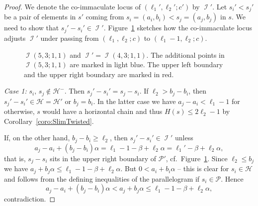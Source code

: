 \documentclass[11pt]{article}
\theoremstyle{definition}
\numberwithin{equation}{section}
\newcommand{\cP}{\mathcal{P}}
\newcommand{\cH}{\mathcal{H}}
\newcommand{\CH}{{\mathcal H}}
\newcommand{\CI}{{\mathcal I}}
\newcommand{\CP}{{\mathcal P}}
\newcommand{\ko}{\overline}
\newcommand{\cb}{{\ko{c}}}
\newcommand{\nImm}{\operatorname{\CI}}
\newcommand{\xa}{\alpha}
\newcommand{\xb}{\beta}
\newcommand{\cl}{s}
\newcommand{\immreg}[4]{
\def\la{#1} 
\def\lb{#2} 
\def\ch{#3} 
\def\cb{#4} 
\draw[color=oliwkowy!40] (-\cb-0.3,-\la/\ch) grid (\la+0.3,\lb+\la/\ch);
\fill[pattern color=parallelogram, pattern=north west lines]
  (0,0) -- (\la,-\la/\ch) -- (\la,0) -- cycle
  (\la-\cb,\lb) -- (-\cb,\lb+\la/\ch) -- (-\cb,\lb) -- cycle;
\draw[thick, color=black]
  (0,0) -- (\la,-\la/\ch) -- (\la,0)
  (\la-\cb,\lb) -- (-\cb,\lb+\la/\ch) -- (-\cb,\lb);
\fill[pattern color=parallelogram, pattern=north west lines]
  (0,0) -- (-\cb,\cb/\ch) -- (-\cb,\lb) --
  (\la-\cb,\lb) -- (\la,\lb-\cb/\ch) -- (\la,0) -- cycle;
\fill[thick, color=origin]
  (0,0) circle (5pt);
\draw[thick, color=origin]
  (\la-\cb,\lb) circle (5pt)
  (-0.5,-0.5) node{$0$};
\foreach \xa in {-1,...,1}
\foreach \xb in {-\cb,...,\la}
\foreach \y in {2,...,\lb} {
  \fill[thick, color=regi]
    (\xa-\cb,\y-1) circle (5pt)
    (\xb+1,\y-1) circle (5pt); }
\pgfmathsetmacro{\hMax}{(\la-2)/\ch}
\foreach \y in {0,...,\hMax} {
  \pgfmathsetmacro{\wMax}{\la-\ch*\y-1}
  \foreach \x in {1,...,\wMax} {
    \fill[thick, color=regii]
      (\la-\x,-\y) circle (5pt)
      (\x-\cb,\y+\lb) circle (5pt); }}
\foreach \x in {2,...,\la} {
  \fill[thick, color=regii]
  (\x-1,0) circle (5pt)
  (\la-\cb-\x+1,\lb) circle (5pt); }
}
\begin{document}
\begin{proof}
We denote the {co-immaculate} locus of 
$(\ell_1',\ell_2';c')$ by $\nImm'$.
Let $\cl_i'<\cl_j'$ be a pair of elements in $\cl'$ 
coming from $\cl_i=(a_i,b_i)<\cl_j=(a_j,b_j)$ in 
$\cl$. We need to show that $\cl_j'-\cl_i'\in\nImm'$. 
Figure~\ref{fig:L1Collapse} sketches how the 
{co-immaculate} locus adjusts $\nImm'$ under passing 
from $(\ell_1,\ell_2;c)$ to $(\ell_1-1,\ell_2;c)$.

\begin{figure}[ht]
\caption{$\nImm(5,3;1,1)$ and $\nImm'=\nImm(4,3;1,1)$. 
The additional points in $\nImm(5,3;1,1)$ are marked in 
light blue. The upper left boundary and
the upper right boundary are marked in red.}
\label{fig:L1Collapse}
\end{figure}

{\em Case 1:} $\cl_i,\,\cl_j\not\in\CH^-$. Then $\cl_j'-\cl_i'=
\cl_j-\cl_i$. If $\ell_2>b_j-b_i$, then $\cl_j'-\cl_i'\in\CH=\CH'$ 
or $b_j=b_i$. In the latter case we have $a_j-a_i<\ell_1-1$ for 
otherwise, $\cl$ would have a horizontal chain and thus 
$H(\cl)\leq2\ell_2-1$ by Corollary~\ref{coro:SlimTwisted}.

If, on the other hand, $b_j-b_i\geq\ell_2$, then $\cl_j'-\cl_i'
\in\nImm'$ unless
$$
a_j-a_i+(b_j-b_i)\xa=\ell_1-1-\xb+\ell_2\xa=\ell_1'-\xb+\ell_2\xa,
$$
that is, $\cl_j-\cl_i$ sits in the upper right boundary of $\CP'$,
cf.\ Figure~\ref{fig:L1Collapse}. Since $\ell_2\leq b_j$ we have 
$a_j+b_j\xa\leq\ell_1-1-\xb+\ell_2\xa$. But $0< a_i+b_i\xa$ -- 
this is clear for $\cl_i\in\cH$ and follows from the defining 
inequalities of the parallelogram if $\cl_i\in\cP$. Hence
$$
a_j-a_i+(b_j-b_i)\xa<a_j+b_j\xa\leq\ell_1-1-\xb+\ell_2\xa,
$$
contradiction.


\end{proof}
\end{document}
